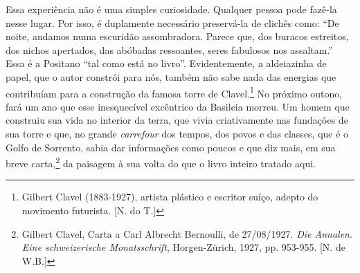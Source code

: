 Essa experiência não é uma simples curiosidade. Qualquer pessoa pode
fazê-la nesse lugar. Por isso, é duplamente necessário preservá-la de
clichês como: ``De noite, andamos numa escuridão assombradora. Parece
que, dos buracos estreitos, dos nichos apertados, das abóbadas
ressoantes, seres fabulosos nos assaltam.'' Essa é a Positano ``tal como
está no livro''. Evidentemente, a aldeiazinha de papel, que o autor
constrói para nós, também não sabe nada das energias que contribuíam
para a construção da famosa torre de Clavel.\footnote{Gilbert Clavel
  (1883-1927), artista plástico e escritor suíço, adepto do movimento
  futurista. [N. do T.]} No próximo outono, fará um ano que esse
inesquecível excêntrico da Basileia morreu. Um homem que construiu sua
vida no interior da terra, que vivia criativamente nas fundações de sua
torre e que, no grande \emph{carrefour} dos tempos, dos povos e das
classes, que é o Golfo de Sorrento, sabia dar informações como poucos e
que diz mais, em sua breve carta,\footnote{Gilbert Clavel, Carta a Carl
  Albrecht Bernoulli, de 27/08/1927. \emph{Die Annalen}. \emph{Eine
  schweizerische Monatsschrift}, Horgen-Zürich, 1927, pp. 953-955. [N.
  de {W.B.}]} da paisagem à sua volta do que o livro inteiro tratado
aqui.

